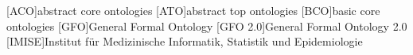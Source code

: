 \begin{acronym}[GFO 2.0]
[ACO]{abstract core ontologies}
[ATO]{abstract top ontologies}
[BCO]{basic core ontologies}
[GFO]{General Formal Ontology}
[GFO 2.0]{General Formal Ontology 2.0}
[IMISE]{Institut für Medizinische Informatik, Statistik und Epidemiologie}
\end{acronym}
